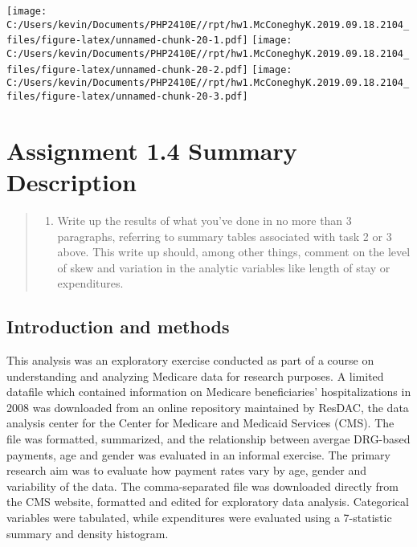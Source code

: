 \documentclass[]{article}
\providecommand{\tightlist}{%
  \setlength{\itemsep}{0pt}\setlength{\parskip}{0pt}}
\begin{document}
\texttt{[image: C:/Users/kevin/Documents/PHP2410E//rpt/hw1.McConeghyK.2019.09.18.2104\_files/figure-latex/unnamed-chunk-20-1.pdf]}
\texttt{[image: C:/Users/kevin/Documents/PHP2410E//rpt/hw1.McConeghyK.2019.09.18.2104\_files/figure-latex/unnamed-chunk-20-2.pdf]}
\texttt{[image: C:/Users/kevin/Documents/PHP2410E//rpt/hw1.McConeghyK.2019.09.18.2104\_files/figure-latex/unnamed-chunk-20-3.pdf]}

\newpage

\hypertarget{assignment-1.4-summary-description}{%
\section{Assignment 1.4 Summary
Description}\label{assignment-1.4-summary-description}}

\begin{quote}
\begin{enumerate}
\def\labelenumi{\arabic{enumi}.}
\setcounter{enumi}{3}
\tightlist
\item
  Write up the results of what you've done in no more than 3 paragraphs,
  referring to summary tables associated with task 2 or 3 above. This
  write up should, among other things, comment on the level of skew and
  variation in the analytic variables like length of stay or
  expenditures.
\end{enumerate}
\end{quote}

\hypertarget{introduction-and-methods}{%
\subsection{Introduction and methods}\label{introduction-and-methods}}

This analysis was an exploratory exercise conducted as part of a course
on understanding and analyzing Medicare data for research purposes. A
limited datafile which contained information on Medicare beneficiaries'
hospitalizations in 2008 was downloaded from an online repository
maintained by ResDAC, the data analysis center for the Center for
Medicare and Medicaid Services (CMS). The file was formatted,
summarized, and the relationship between avergae DRG-based payments, age
and gender was evaluated in an informal exercise. The primary research
aim was to evaluate how payment rates vary by age, gender and
variability of the data. The comma-separated file was downloaded
directly from the CMS website, formatted and edited for exploratory data
analysis. Categorical variables were tabulated, while expenditures were
evaluated using a 7-statistic summary and density histogram.
\end{document}

